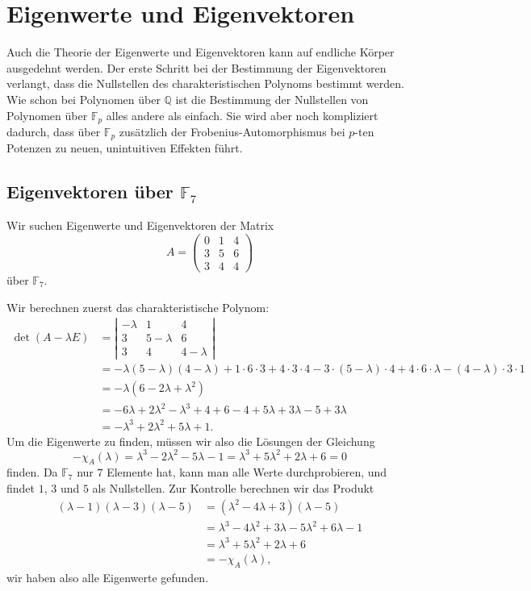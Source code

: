 %
%
%
\section{Eigenwerte und Eigenvektoren}
Auch die Theorie der Eigenwerte und Eigenvektoren kann auf endliche Körper
ausgedehnt werden.
Der erste Schritt bei der Bestimmung der Eigenvektoren verlangt, dass
die Nullstellen des charakteristischen Polynoms bestimmt werden.
Wie schon bei Polynomen über $\mathbb Q$ ist die Bestimmung der Nullstellen
von Polynomen über $\mathbb F_p$ alles andere als einfach.
Sie wird aber noch kompliziert dadurch, dass über $\mathbb F_p$
zusätzlich der Frobenius-Automorphismus bei $p$-ten Potenzen zu
neuen, unintuitiven Effekten führt.

\subsection{Eigenvektoren über $\mathbb F_7$}
Wir suchen Eigenwerte und Eigenvektoren der Matrix
\[
A
=
\begin{pmatrix}
0&1&4\\
3&5&6\\
3&4&4
\end{pmatrix}
\]
über $\mathbb F_7$.

Wir berechnen zuerst das charakteristische Polynom:
\begin{align*}
\det(A-\lambda E)
&
=
\left|\begin{matrix}
-\lambda&1        &4\\
3       &5-\lambda&6\\
3       &4        &4-\lambda
\end{matrix}\right|
\\
&=
-\lambda(5-\lambda)(4-\lambda)
+1\cdot6\cdot3
+4\cdot3\cdot 4
-3\cdot(5-\lambda)\cdot 4
+4\cdot6\cdot\lambda
-(4-\lambda)\cdot3\cdot 1
\\
&=
-\lambda(6-2\lambda+\lambda^2)
\\
&=
-6\lambda+2\lambda^2-\lambda^3
+4
+6
-4+5\lambda
+3\lambda
-5+3\lambda
\\
&=
-\lambda^3+2\lambda^2+5\lambda+1.
\end{align*}
Um die Eigenwerte zu finden, müssen wir also die Lösungen der
Gleichung
\[
-\chi_A(\lambda)
=
\lambda^3
-2\lambda^2
-5\lambda
-1
=
\lambda^3
+5\lambda^2
+2\lambda
+6
=
0
\]
finden.
Da $\mathbb F_7$ nur $7$ Elemente hat, kann man alle Werte durchprobieren,
und findet $1$, $3$ und $5$ als Nullstellen.
Zur Kontrolle berechnen wir das Produkt
\begin{align*}
(\lambda -1)(\lambda-3)(\lambda-5)
&
=
(\lambda^2-4\lambda+3)(\lambda-5)
\\
&=
\lambda^3-4\lambda^2+3\lambda
-5\lambda^2+6\lambda-1
\\
&=
\lambda^3+5\lambda^2+2\lambda+6
\\
&=
-\chi_A(\lambda),
\end{align*}
wir haben also alle Eigenwerte gefunden.

